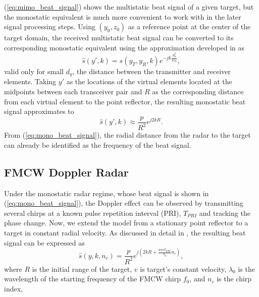 \documentclass[10pt,journal,final]{IEEEtran}
\begin{document}
(\ref{eq:mimo_beat_signal}) shows the multistatic beat signal of a given target, but the monostatic equivalent is much more convenient to work with in the later signal processing steps. Using $(y_0,z_0)$ as a reference point at the center of the target domain, the received multistatic beat signal can be converted to its corresponding monostatic equivalent using the approximation developed in \cite{muhammet:testbeds} as
\begin{equation}
	\label{eq:mult-to-mono}
	\hat{s}(y',k) = s(y_T,y_R,k) e^{-jk\frac{d_y^2}{4z_0}},
\end{equation}
valid only for small $d_y$, the distance between the transmitter and receiver elements. Taking $y'$ as the locations of the virtual elements located at the midpoints between each transceiver pair and $R$ as the corresponding distance from each virtual element to the point reflector, the resulting monostatic beat signal approximates to
\begin{equation}
	\label{eq:mono_beat_signal}
	\hat{s}(y',k) \approx \frac{p}{R^2}e^{j2kR}.
\end{equation}
From (\ref{eq:mono_beat_signal}), the radial distance from the radar to the target can already be identified as the frequency of the beat signal. %

\subsection{FMCW Doppler Radar}
\label{subsec:fmcw_doppler_radar}

Under the monostatic radar regime, whose beat signal is shown in (\ref{eq:mono_beat_signal}), the Doppler effect can be observed by transmitting several chirps at a known pulse repetition interval (PRI), $T_{PRI}$ and tracking the phase change. Now, we extend the model from a stationary point reflector to a target in constant radial velocity. As discussed in detail in \cite{fmcw:range_doppler}, the resulting beat signal can be expressed as
\begin{equation}
	\label{eq:doppler_final}
	\hat{s}(y,k,n_c) = \frac{p}{R^2} e^{j(2kR + \frac{4\pi v T_{PRI}}{\lambda_0}n_c)},
\end{equation}
where $R$ is the initial range of the target, $v$ is target's constant velocity, $\lambda_0$ is the wavelength of the starting frequency of the FMCW chirp $f_0$, and $n_c$ is the chirp index,
\end{document}
